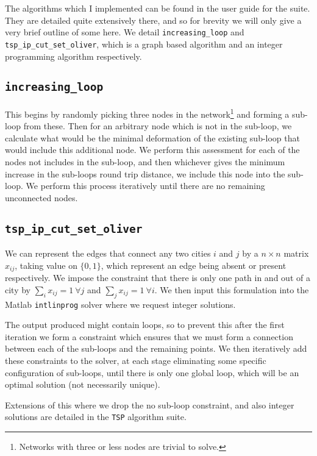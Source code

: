 \documentclass[a4paper, 11pt]{article}
\begin{document}
The algorithms which I implemented can be found in the user guide for the suite. They are detailed quite extensively there, and so for brevity we will only give a very brief outline of some here. We detail \verb|increasing_loop| and \verb|tsp_ip_cut_set_oliver|, which is a graph based algorithm and an integer programming algorithm respectively.

\subsection{\texttt{increasing\_loop}}
\label{subsec:increasing_loop}

This begins by randomly picking three nodes in the network\footnote{Networks with three or less nodes are trivial to solve.} and forming a sub-loop from these. Then for an arbitrary node which is not in the sub-loop, we calculate what would be the minimal deformation of the existing sub-loop that would include this additional node. We perform this assessment for each of the nodes not includes in the sub-loop, and then whichever gives the minimum increase in the sub-loops round trip distance, we include this node into the sub-loop. We perform this process iteratively until there are no remaining unconnected nodes.

\subsection{\texttt{tsp\_ip\_cut\_set\_oliver}}
\label{subsec:tsp_ip_cut_set_oliver}

We can represent the edges that connect any two cities $ i $ and $ j $ by a $ n \times n $ matrix $ x_{ij} $, taking value on $ \{0, 1\} $, which represent an edge being absent or present respectively. We impose the constraint that there is only one path in and out of a city by $ \sum_{i} x_{ij} = 1 \: \forall j $ and  $ \sum_{j} x_{ij} = 1 \: \forall i $. We then input this formulation into the Matlab \verb|intlinprog| solver where we request integer solutions.

The output produced might contain loops, so to prevent this after the first iteration we form a constraint which ensures that we must form a connection between each of the sub-loops and the remaining points. We then iteratively add these constraints to the solver, at each stage eliminating some specific configuration of sub-loops, until there is only one global loop, which will be an optimal solution (not necessarily unique).

Extensions of this where we drop the no sub-loop constraint, and also integer solutions are detailed in the \texttt{TSP} algorithm suite.
\end{document}
